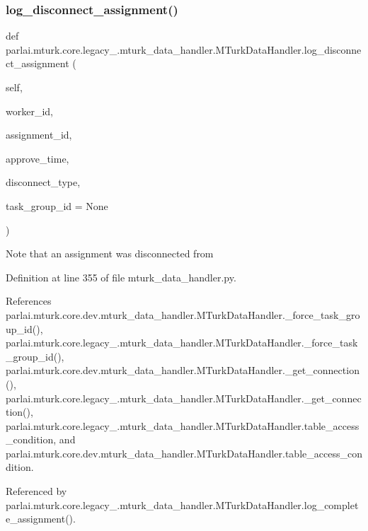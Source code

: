 \subsubsection{\texorpdfstring{log\+\_\+disconnect\+\_\+assignment()}{log\_disconnect\_assignment()}}
{\footnotesize\ttfamily def parlai.\+mturk.\+core.\+legacy\+\_.\+mturk\+\_\+data\+\_\+handler.\+M\+Turk\+Data\+Handler.\+log\+\_\+disconnect\+\_\+assignment (\begin{DoxyParamCaption}\item[{}]{self,  }\item[{}]{worker\+\_\+id,  }\item[{}]{assignment\+\_\+id,  }\item[{}]{approve\+\_\+time,  }\item[{}]{disconnect\+\_\+type,  }\item[{}]{task\+\_\+group\+\_\+id = {\ttfamily None} }\end{DoxyParamCaption})}

\begin{DoxyVerb}Note that an assignment was disconnected from\end{DoxyVerb}
 

Definition at line 355 of file mturk\+\_\+data\+\_\+handler.\+py.



References parlai.\+mturk.\+core.\+dev.\+mturk\+\_\+data\+\_\+handler.\+M\+Turk\+Data\+Handler.\+\_\+force\+\_\+task\+\_\+group\+\_\+id(), parlai.\+mturk.\+core.\+legacy\+\_.\+mturk\+\_\+data\+\_\+handler.\+M\+Turk\+Data\+Handler.\+\_\+force\+\_\+task\+\_\+group\+\_\+id(), parlai.\+mturk.\+core.\+dev.\+mturk\+\_\+data\+\_\+handler.\+M\+Turk\+Data\+Handler.\+\_\+get\+\_\+connection(), parlai.\+mturk.\+core.\+legacy\+\_.\+mturk\+\_\+data\+\_\+handler.\+M\+Turk\+Data\+Handler.\+\_\+get\+\_\+connection(), parlai.\+mturk.\+core.\+legacy\+\_.\+mturk\+\_\+data\+\_\+handler.\+M\+Turk\+Data\+Handler.\+table\+\_\+access\+\_\+condition, and parlai.\+mturk.\+core.\+dev.\+mturk\+\_\+data\+\_\+handler.\+M\+Turk\+Data\+Handler.\+table\+\_\+access\+\_\+condition.



Referenced by parlai.\+mturk.\+core.\+legacy\+\_.\+mturk\+\_\+data\+\_\+handler.\+M\+Turk\+Data\+Handler.\+log\+\_\+complete\+\_\+assignment().

